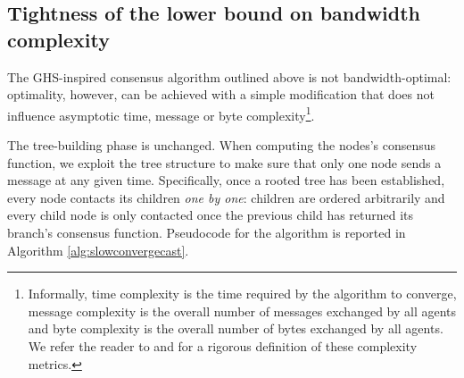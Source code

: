 \documentclass[letterpaper,10pt,conference]{ieeeconf}
\begin{document}
\subsection{Tightness of the lower bound on bandwidth complexity}
The GHS-inspired consensus algorithm outlined above is not bandwidth-optimal: optimality, however, can be achieved with a simple modification that does not influence asymptotic time, message or byte complexity\footnote{Informally, time complexity is the time required by the algorithm to converge, message complexity is the overall number of messages exchanged by all agents and byte complexity is the overall number of bytes exchanged by all agents. We refer the reader to \cite{FR-MP:13} and \cite{FR-MP:14a} for a rigorous definition of these complexity metrics.}.

The tree-building phase is unchanged. When computing the nodes's consensus function, we exploit the tree structure to make sure that only one node sends a message at any given time. Specifically, once a rooted tree has been established, every node contacts its children \emph{one by one}: children are ordered arbitrarily and every child node is only contacted once the previous child has returned its branch's consensus function.
Pseudocode for the algorithm is reported in Algorithm \ref{alg:slowconvergecast}.
\end{document}
